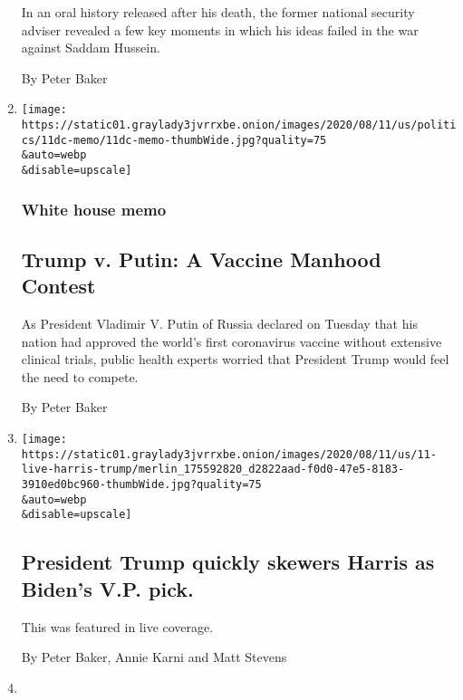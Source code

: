 \begin{enumerate}
  In an oral history released after his death, the former national
  security adviser revealed a few key moments in which his ideas failed
  in the war against Saddam Hussein.

  By Peter Baker
\item
  \href{/2020/08/11/us/politics/trump-putin-vaccine.html}{}

  \texttt{[image: https://static01.graylady3jvrrxbe.onion/images/2020/08/11/us/politics/11dc-memo/11dc-memo-thumbWide.jpg?quality=75\\\&auto=webp\\\&disable=upscale]}

  \hypertarget{white-house-memo-1}{%
  \subsubsection{White house memo}\label{white-house-memo-1}}

  \hypertarget{trump-v-putin-a-vaccine-manhood-contest}{%
  \subsection{Trump v. Putin: A Vaccine Manhood
  Contest}\label{trump-v-putin-a-vaccine-manhood-contest}}

  As President Vladimir V. Putin of Russia declared on Tuesday that his
  nation had approved the world's first coronavirus vaccine without
  extensive clinical trials, public health experts worried that
  President Trump would feel the need to compete.

  By Peter Baker
\item
  \href{/live/2020/08/11/us/biden-vs-trump/president-trump-quickly-skewers-harris-as-bidens-vp-pick}{}

  \texttt{[image: https://static01.graylady3jvrrxbe.onion/images/2020/08/11/us/11-live-harris-trump/merlin\_175592820\_d2822aad-f0d0-47e5-8183-3910ed0bc960-thumbWide.jpg?quality=75\\\&auto=webp\\\&disable=upscale]}

  \hypertarget{president-trump-quickly-skewers-harris-as-bidens-vp-pick}{%
  \subsection{President Trump quickly skewers Harris as Biden's V.P.
  pick.}\label{president-trump-quickly-skewers-harris-as-bidens-vp-pick}}

  This was featured in live coverage.

  By Peter Baker, Annie Karni and Matt Stevens
\item
  \href{/es/2020/08/11/espanol/estados-unidos/3-noviembre-elecciones.html}{}


\end{enumerate}
